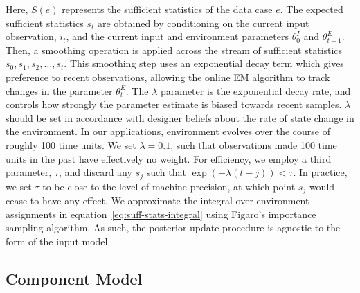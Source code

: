 \documentclass[letterpaper]{article}
\begin{document}
Here, $S(e)$ represents the sufficient statistics of the data case $e$. 
The expected sufficient statistics $s_t$ are obtained by conditioning on the current input observation, $i_t$, and the current input and environment parameters $\theta_0^I$ and $\theta_{t-1}^E$.
Then, a smoothing operation is applied across the stream of sufficient statistics $s_0, s_1, s_2, \ldots, s_t$.
This smoothing step uses an exponential decay term which gives preference to recent observations, allowing the online EM algorithm to track changes in the parameter $\theta^E_t$.
The $\lambda$ parameter is the exponential decay rate, and controls how strongly the parameter estimate is biased towards recent samples.
$\lambda$ should be set in accordance with designer beliefs about the rate of state change in the environment. In our applications, environment evolves over the course of roughly 100 time units.
We set $\lambda=0.1$, such that observations made 100 time units in the past have effectively no weight.
For efficiency, we employ a third parameter, $\tau$, and discard any $s_j$ such that $\exp(-\lambda (t - j)) < \tau$. In practice, we set $\tau$ to be close to the level of machine precision, at which point $s_j$ would cease to have any effect.
We approximate the integral over environment assignments in equation~\ref{eq:suff-stats-integral} using Figaro's importance sampling algorithm.
As such, the posterior update procedure is agnostic to the form of the input model.

\subsection{Component Model}
\end{document}
